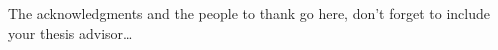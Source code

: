 
\begin{acknowledgements}

\addchaptertocentry{\acknowledgementname}

The acknowledgments and the people to thank go here, don't forget to include your thesis advisor\ldots

\lipsum[1-6]

\end{acknowledgements}